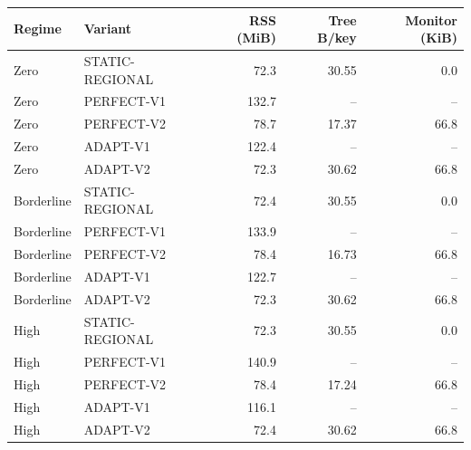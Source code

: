 \begin{tabular}{llrrr}
\toprule
Regime & Variant & RSS (MiB) & Tree B/key & Monitor (KiB) \\
\midrule
Zero & STATIC-REGIONAL & 72.3 & 30.55 & 0.0 \\
Zero & PERFECT-V1 & 132.7 & -- & -- \\
Zero & PERFECT-V2 & 78.7 & 17.37 & 66.8 \\
Zero & ADAPT-V1 & 122.4 & -- & -- \\
Zero & ADAPT-V2 & 72.3 & 30.62 & 66.8 \\
Borderline & STATIC-REGIONAL & 72.4 & 30.55 & 0.0 \\
Borderline & PERFECT-V1 & 133.9 & -- & -- \\
Borderline & PERFECT-V2 & 78.4 & 16.73 & 66.8 \\
Borderline & ADAPT-V1 & 122.7 & -- & -- \\
Borderline & ADAPT-V2 & 72.3 & 30.62 & 66.8 \\
High & STATIC-REGIONAL & 72.3 & 30.55 & 0.0 \\
High & PERFECT-V1 & 140.9 & -- & -- \\
High & PERFECT-V2 & 78.4 & 17.24 & 66.8 \\
High & ADAPT-V1 & 116.1 & -- & -- \\
High & ADAPT-V2 & 72.4 & 30.62 & 66.8 \\
\bottomrule
\end{tabular}
